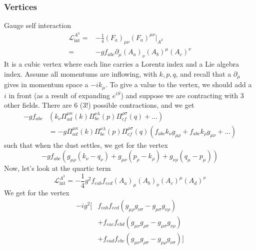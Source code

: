 \documentclass[a4paper]{book}
\theoremstyle{definition}
\theoremstyle{remark}
\begin{document}
\subsubsection{Vertices}
Gauge self interaction 
\begin{equation}
    \begin{aligned}
        \mathcal{L}^{A^3}_{\text{int}} =& -\frac{1}{4}(F_a)_{\mu\nu}(F_a)^{\mu\nu} \big|_{A^3} \\ 
        =& -g f_{abc}\partial_\mu (A_a)_\nu (A_b)^\mu (A_c)^\nu
    \end{aligned}
\end{equation}
It is a cubic vertex where each line carries a Lorentz index and a Lie algebra index. Assume all momentums are inflowing, with $k,p, q$, and recall that a $\partial_\mu$ gives in momentum space a $-ik_\mu$. To give a value to the vertex, we should add a $i$ in front (as a result of expanding $e^{iS}$) and suppose we are contracting with 3 other fields. There are 6 ($3!$) possible contractions, and we get 
\begin{equation}
    \begin{aligned}
        -g f_{abc}&(k_\nu \Pi^{\mu \kappa}_{ad}(k)\Pi^{\nu \lambda }_{be}(p)\Pi^{\rho\sigma}_{cf}(q) + \dots) \\
        &= -g \Pi^{\mu \kappa}_{ad}(k)\Pi^{\nu \lambda }_{be}(p)\Pi^{\rho\sigma}_{cf}(q)(f_{abc} k_\nu g_{\mu\rho} + f_{abc}k_\rho g_{\mu\nu} + \dots) 
    \end{aligned}
\end{equation}
such that when the dust settles, we get for the vertex 
\begin{equation}
    -g f_{abc}(g_{\mu\rho} (k_\nu - q_\nu) + g_{\mu\nu}(p_\rho - k_\rho) + g_{\nu\rho} (q_{\mu} - p_\mu))
\end{equation}
Now, let's look at the quartic term 
\begin{equation}
    \mathcal{L}^{A^3}_{\text{int}} = -\frac{1}{4}g^2 f_{eab}f_{ecd} (A_a)_\mu (A_b)_\nu (A_c)^\mu (A_d)^\nu
\end{equation}
We get for the vertex 
\begin{equation}
    \begin{aligned}
        -ig^2 [ & f_{eab}f_{ecd}(g_{\mu\rho}g_{\nu\sigma} - g_{\mu \sigma}g_{\nu \rho}) \\ 
        &+ f_{eac}f_{ebd}(g_{\mu\nu}g_{\rho\sigma} - g_{\mu\sigma}g_{\nu\rho}) \\
        &+ f_{ead}f_{ebc}(g_{\mu\nu}g_{\rho\sigma} - g_{\mu\rho}g_{\nu\sigma}) ]
    \end{aligned}
\end{equation}
\end{document}

